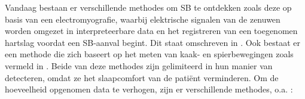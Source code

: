 \documentclass{hogent-article}
\begin{document}

Vandaag bestaan er verschillende methodes om SB te ontdekken zoals deze op basis van een electromyograﬁe, waarbij elektrische signalen van de zenuwen worden omgezet in interpreteerbare data en het registreren van een toegenomen hartslag voordat een SB-aanval begint.  Dit staat omschreven in  \cite{Deregibus_2013}.  Ook bestaat er een methode die zich baseert op het meten van kaak- en spierbewegingen zoals vermeld in \cite{Shochat_2007}  .  Beide van deze methodes zijn gelimiteerd in hun manier van detecteren, omdat ze het slaapcomfort van de patiënt verminderen. \bigbreak
\noindent
Om de hoeveelheid opgenomen data te verhogen, zijn  er verschillende methodes, o.a. :
\end{document}

